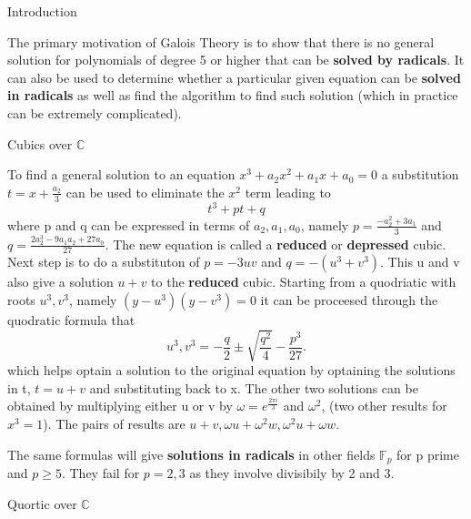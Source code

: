\documentclass[12pt, letterpaper]{article}
\newcommand{\C}{\mathbb{C}}
\newcommand{\F}{\mathbb{F}}
\begin{document}
\begin{section}{Introduction}

  The primary motivation of Galois Theory is to show that there is no general
  solution for polynomials of degree 5 or higher that can be \textbf{solved by
    radicals}. It can also be used to determine whether a particular given
  equation can be \textbf{solved in radicals} as well as find the algorithm to
  find such solution (which in practice can be extremely complicated).

  \begin{subsection}{Cubics over \(\C\)}

    To find a general solution to an equation
    \(x^{3} + a_{2}x^{2} + a_{1}x + a_{0} = 0\) a substitution
    \(t = x + \frac{a_{2}}{3}\) can be used to eliminate the \(x^{2}\) term
    leading to \[t^{3} + pt + q\] where p and q can be expressed in terms of
    \(a_{2}, a_{1}, a_{0}\), namely \(p = \frac{-a^{2}_{2} + 3a_{1}}{3}\) and
    \(q = \frac{2a^{3}_{2} -9a_{1}a_{2} + 27a_{0}}{27}\). The new equation is
    called a \textbf{reduced} or \textbf{depressed} cubic. Next step is to do a
    substituton of \(p = -3uv\) and \(q = -(u^{3} + v^{3})\). This u and v also
    give a solution \(u + v\) to the \textbf{reduced} cubic. Starting from a
    quodriatic with roots \(u^{3}, v^{3}\), namely
    \((y - u^{3})(y - v^{3}) = 0\) it can be proceesed through the quodratic
    formula
    that \[u^{3}, v^{3} = -\frac{q}{2} \pm \sqrt{\frac{q^{2}}{4}} - \frac{p^{3}}{27}.\]
    which helps optain a solution to the original equation by optaining the
    solutions in t, \(t = u + v\) and substituting back to x. The other two
    solutions can be obtained by multiplying either u or v by
    \(\omega = e^{\frac{2\pi i}{3}}\) and \(\omega^{2}\), (two other results for
    \(x^{3} = 1\)). The pairs of results are
    \(u + v, \omega u + \omega^{2} w, \omega^{2} u + \omega w\).

    The same formulas will give \textbf{solutions in radicals} in other fields
    \(\F_{p}\) for p prime and \(p \geq 5\). They fail for \(p = 2, 3\)
    as they involve divisibily by 2 and 3.

  \end{subsection}

  \begin{subsection}{Quortic over \(\C\)}


\end{subsection}
\end{section}
\end{document}
